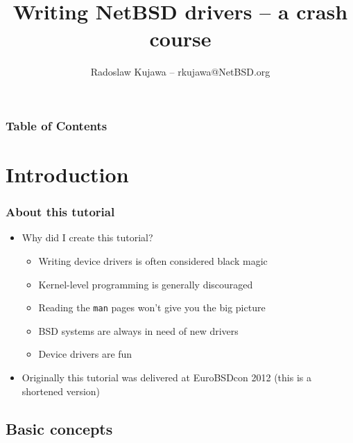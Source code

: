 \documentclass[dvipsnames,table]{beamer}
\title{Writing NetBSD drivers -- a crash course}
\author{Radoslaw Kujawa -- rkujawa@NetBSD.org}
\institute{The NetBSD Foundation}
\begin{document}
\begin{frame}
\titlepage
\end{frame}

\begin{frame}[allowframebreaks]
\frametitle{Table of Contents}
{
\hypersetup{colorlinks=true,linkcolor=black,urlcolor=NetBSD-orange}
\tableofcontents
}
\end{frame}

\section{Introduction}

\begin{frame}
\frametitle{About this tutorial}
\begin{itemize}
	\item Why did I create this tutorial?
	\begin{itemize}
		\item Writing device drivers is often considered black magic
		\item Kernel-level programming is generally discouraged
		\item Reading the {\tt man} pages won't give you the big picture
		\item BSD systems are always in need of new drivers
		\item Device drivers are fun {\Large \smiley}
	\end{itemize}
	\item Originally this tutorial was delivered at EuroBSDcon 2012 (this is a shortened version)
\end{itemize}
\end{frame}


\subsection{Basic concepts}
\end{document}
